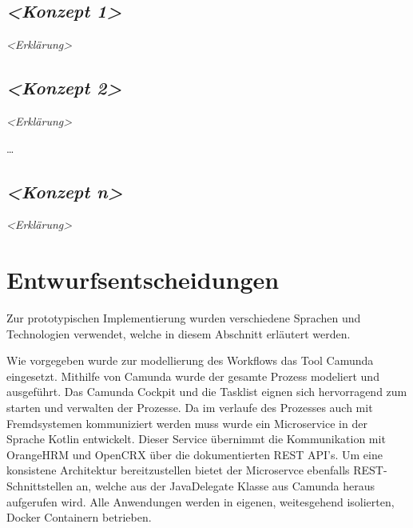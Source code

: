 \documentclass[]{article}
\begin{document}
\hypertarget{__emphasis_konzept_1_emphasis}{%
\subsection{\texorpdfstring{\emph{\textless{}Konzept
1\textgreater{}}}{\textless{}Konzept 1\textgreater{}}}\label{__emphasis_konzept_1_emphasis}}

\emph{\textless{}Erklärung\textgreater{}}

\hypertarget{__emphasis_konzept_2_emphasis}{%
\subsection{\texorpdfstring{\emph{\textless{}Konzept
2\textgreater{}}}{\textless{}Konzept 2\textgreater{}}}\label{__emphasis_konzept_2_emphasis}}

\emph{\textless{}Erklärung\textgreater{}}

\ldots{}

\hypertarget{__emphasis_konzept_n_emphasis}{%
\subsection{\texorpdfstring{\emph{\textless{}Konzept
n\textgreater{}}}{\textless{}Konzept n\textgreater{}}}\label{__emphasis_konzept_n_emphasis}}

\emph{\textless{}Erklärung\textgreater{}}

\hypertarget{section-design-decisions}{%
\section{Entwurfsentscheidungen}\label{section-design-decisions}}

Zur prototypischen Implementierung wurden verschiedene Sprachen und Technologien verwendet, welche in diesem Abschnitt erläutert werden.

Wie vorgegeben wurde zur modellierung des Workflows das Tool Camunda eingesetzt. Mithilfe von Camunda wurde der gesamte Prozess modeliert und ausgeführt. Das Camunda Cockpit und die Tasklist eignen sich hervorragend zum starten und verwalten der Prozesse. 
Da im verlaufe des Prozesses auch mit Fremdsystemen kommuniziert werden muss wurde ein Microservice in der Sprache Kotlin entwickelt. Dieser Service übernimmt die Kommunikation mit OrangeHRM und OpenCRX über die dokumentierten REST API's.
Um eine konsistene Architektur bereitzustellen bietet der Microservce ebenfalls REST-Schnittstellen an, welche aus der JavaDelegate Klasse aus Camunda heraus aufgerufen wird. 
Alle Anwendungen werden in eigenen, weitesgehend isolierten, Docker Containern betrieben.
\end{document}
